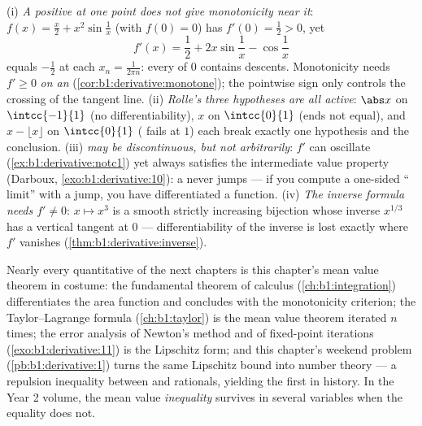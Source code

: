\begin{remark}
(i) \emph{A positive  at one point does not give
monotonicity near it}: $f(x) = \frac x2 + x^2\sin\frac1x$ (with
$f(0) = 0$) has $f'(0) = \frac12 > 0$, yet
\[
f'(x) = \frac12 + 2x\sin\frac1x - \cos\frac1x
\]
equals $-\frac12$ at each $x_n = \frac{1}{2\pi n}$: every
 of $0$ contains descents. Monotonicity needs $f'
\geq 0$ \emph{on an }
(\cref{cor:b1:derivative:monotone}); the pointwise sign only
controls the crossing of the tangent line. (ii) \emph{Rolle's
three hypotheses are all active}: $\abs x$ on $\intcc{-1}{1}$
(no  differentiability), $x$ on $\intcc{0}{1}$ (ends not
equal), and $x - \lfloor x\rfloor$ on $\intcc{0}{1}$ (
fails at $1$) each break exactly one hypothesis and the
conclusion. (iii) \emph{ may be discontinuous, but
not arbitrarily}: $f'$ can oscillate
(\cref{ex:b1:derivative:notc1}) yet always satisfies the
intermediate value property (Darboux,
\cref{exo:b1:derivative:10}): a  never jumps --- if
you compute a one-sided `` limit'' with a jump, you
have differentiated a  function. (iv) \emph{The
inverse formula needs $f' \neq 0$}: $x \mapsto x^3$ is a smooth
strictly increasing bijection whose inverse $x^{1/3}$ has a
vertical tangent at $0$ --- differentiability of the inverse is
lost exactly where $f'$ vanishes
(\cref{thm:b1:derivative:inverse}).
\end{remark}

\begin{remark}
Nearly every quantitative  of the next chapters is this
chapter's mean value theorem in costume: the fundamental theorem
of calculus (\cref{ch:b1:integration}) differentiates the area
function and concludes with the monotonicity criterion; the
Taylor--Lagrange formula (\cref{ch:b1:taylor}) is the mean value
theorem iterated $n$ times; the error analysis of Newton's method
and of fixed-point iterations (\cref{exo:b1:derivative:11}) is
the Lipschitz form; and this chapter's weekend problem
(\cref{pb:b1:derivative:1}) turns the same Lipschitz bound into
number theory --- a repulsion inequality between  and rationals, yielding the first 
in history. In the Year 2 volume, the mean value
\emph{inequality} survives in several variables when the equality
does not.
\end{remark}

